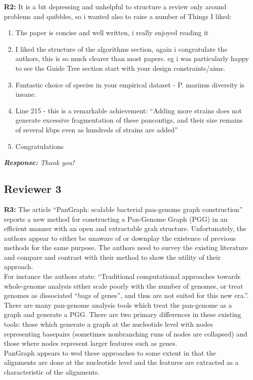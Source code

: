 \documentclass[aps,rmp,onecolumn]{revtex4-1}
\newcommand{\reviewer}[2]{\textbf{#1:} #2\vskip 5mm}
\newcommand{\response}[1]{{\it {\color{response}\textbf{Response:} #1}}\vskip 5mm}
\begin{document}
\reviewer{R2}{It is a bit depressing and unhelpful to structure a review only around problems and quibbles, so i wanted also to raise a number of
      Things I liked:

      \begin{enumerate}
            \item The paper is concise and well written, i really enjoyed reading it
            \item I liked the structure of the algorithms section, again i congratulate the authors, this is so much clearer than most papers. eg i was particularly happy to see the Guide Tree section start with your design constraints/aims.
            \item Fantastic choice of species in your empirical dataset - P. marinus diversity is insane.
            \item Line 215 - this is a remarkable achievement: ``Adding more strains does not generate excessive fragmentation of these pancontigs, and their size remains of several kbps even as hundreds of strains are added''
            \item Congratulations
      \end{enumerate}
}
\response{Thank you!}

\subsection*{Reviewer 3}

\reviewer{R3}{The article ``PanGraph: scalable bacterial pan-genome graph construction'' reports a new method for constructing a Pan-Genome Graph (PGG) in an efficient manner with an open and extractable grah structure. Unfortunately, the authors appear to either be unaware of or downplay the existence of previous methods for the same purpose. The authors need to survey the existing literature and compare and contrast with their method to show the utility of their approach.\\
      For instance the authors state: ``Traditional computational approaches towards whole-genome analysis either scale poorly with the number of genomes, or treat genomes as dissociated ``bags of genes'', and thus are not suited for this new era.''. There are many pan-genome analysis tools which treat the pan-genome as a graph and generate a PGG. There are two primary differences in these existing tools: those which generate a graph at the nucleotide level with nodes representing basepairs (sometimes nonbranching runs of nodes are collapsed) and those where nodes represent larger features such as genes.\\
      PanGraph appears to wed these approaches to some extent in that the alignments are done at the nucleotide level and the features are extracted as a characteristic of the alignments.}
\end{document}
